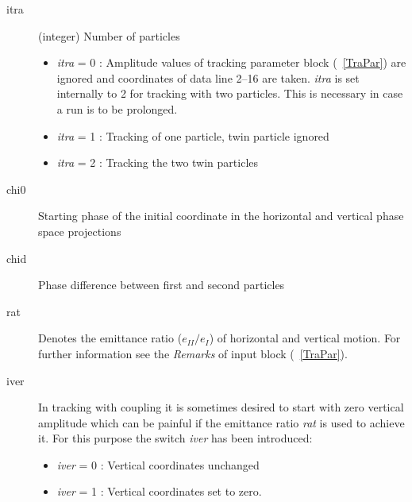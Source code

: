 \documentclass[a4paper,11pt]{report}
\begin{document}
\begin{description}
\item [itra] (integer) Number of particles
 \begin{itemize}
 \item {\em itra} \/= 0 : Amplitude values of tracking parameter block
   (~\ref{TraPar}) are ignored and coordinates of data line 2--16 are
   taken. {\em itra} \/is set internally to 2 for tracking with two
   particles.  This is necessary in case a run is to be prolonged.
 \item {\em itra} \/= 1 : Tracking of one particle, twin particle
   ignored
 \item {\em itra} \/= 2 : Tracking the two twin particles
 \end{itemize}
\item [chi0] Starting phase of the initial coordinate in the
  horizontal and vertical phase space projections
\item [chid] Phase difference between first and second particles
\item [rat] Denotes the emittance ratio ($e_{II}/e_I$) of horizontal
  and vertical motion. For further information see the {\em Remarks}
  \/of input block (~\ref{TraPar}).
\item [iver] In tracking with coupling it is sometimes desired to
  start with zero vertical amplitude which can be painful if the
  emittance ratio {\em rat} \/is used to achieve it. For this purpose
  the switch {\em iver} \/has been introduced:
\begin{itemize}
\item {\em iver} \/= 0 : Vertical coordinates unchanged
\item {\em iver} \/= 1 : Vertical coordinates set to zero.
\end{itemize}
\end{description}
\end{document}
